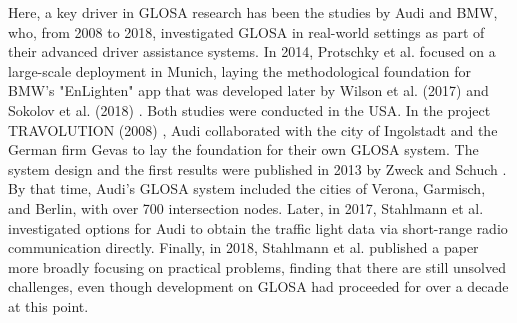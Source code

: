 \nocite{zhao_green_2023, coppola_integrated_2022, seredynski_complementing_2014, seredynski_improving_2014, radivojevic_impact_2016} %

Here, a key driver in GLOSA research has been the studies by Audi and BMW, who, from 2008 to 2018, investigated GLOSA in real-world settings as part of their advanced driver assistance systems. In 2014, Protschky et al. \cite{protschky_extensive_2014, protschky_adaptive_2014} focused on a large-scale deployment in Munich, laying the methodological foundation for BMW's "EnLighten" app that was developed later by Wilson et al. (2017) \cite{wilson_driver_2017} and Sokolov et al. (2018) \cite{sokolov_effects_2018}. Both studies were conducted in the USA. In the project TRAVOLUTION (2008) \cite{braun_travolution-netzweite_2009}, Audi collaborated with the city of Ingolstadt and the German firm Gevas to lay the foundation for their own GLOSA system. The system design and the first results were published in 2013 by Zweck and Schuch \cite{zweck_traffic_2013}. By that time, Audi's GLOSA system included the cities of Verona, Garmisch, and Berlin, with over 700 intersection nodes. Later, in 2017, Stahlmann et al. \cite{stahlmann_multi-hop_2017} investigated options for Audi to obtain the traffic light data via short-range radio communication directly. Finally, in 2018, Stahlmann et al. \cite{stahlmann_exploring_2018} published a paper more broadly focusing on practical problems, finding that there are still unsolved challenges, even though development on GLOSA had proceeded for over a decade at this point.

